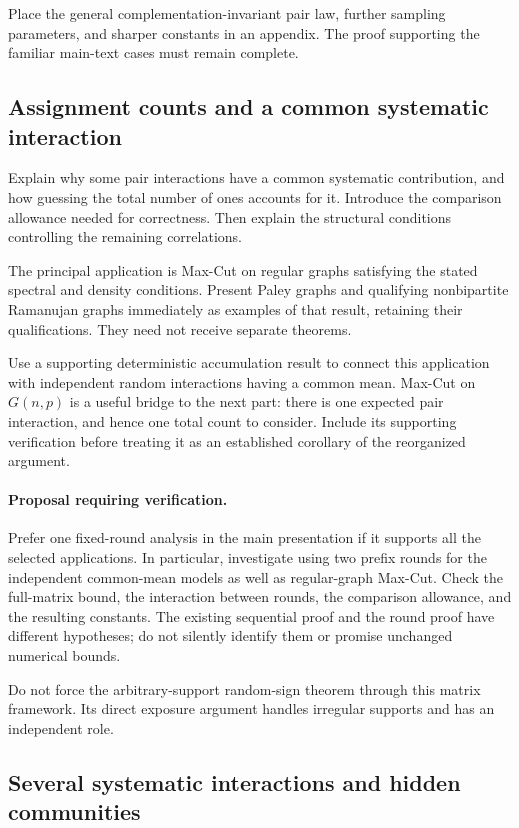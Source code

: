\documentclass[11pt,a4paper]{article}
\begin{document}
Place the general complementation-invariant pair law, further sampling
parameters, and sharper constants in an appendix. The proof supporting
the familiar main-text cases must remain complete.

\subsection{Assignment counts and a common systematic interaction}

Explain why some pair interactions have a common systematic contribution,
and how guessing the total number of ones accounts for it. Introduce the
comparison allowance needed for correctness. Then explain the structural
conditions controlling the remaining correlations.

The principal application is Max-Cut on regular graphs satisfying the
stated spectral and density conditions. Present Paley graphs and qualifying
nonbipartite Ramanujan graphs immediately as examples of that result,
retaining their qualifications. They need not receive separate theorems.

Use a supporting deterministic accumulation result to connect this
application with independent random interactions having a common mean.
Max-Cut on $G(n,p)$ is a useful bridge to the next part: there is one
expected pair interaction, and hence one total count to consider.
Include its supporting verification before treating it as an established
corollary of the reorganized argument.

\paragraph{Proposal requiring verification.}
Prefer one fixed-round analysis in the main presentation if it supports
all the selected applications. In particular, investigate using two prefix
rounds for the independent common-mean models as well as regular-graph
Max-Cut. Check the full-matrix bound, the interaction between rounds, the
comparison allowance, and the resulting constants. The existing sequential
proof and the round proof have different hypotheses; do not silently
identify them or promise unchanged numerical bounds.

Do not force the arbitrary-support random-sign theorem through this
matrix framework. Its direct exposure argument handles irregular supports
and has an independent role.

\subsection{Several systematic interactions and hidden communities}
\end{document}
